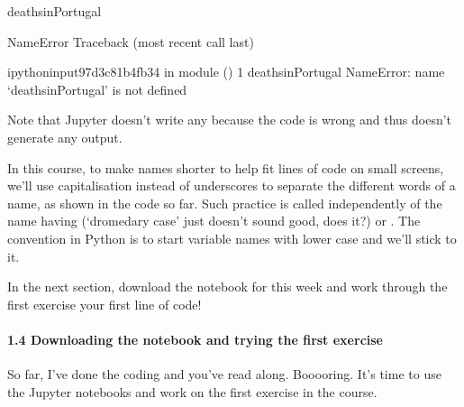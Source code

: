 \documentclass[letterpaper,10pt,english]{sphinxmanual}
\begin{document}
{
\begin{sphinxVerbatim}[commandchars=\\\{\}]
\llap{\color{nbsphinxin}[ ]:\,\hspace{\fboxrule}\hspace{\fboxsep}}
deathsinPortugal
\PYGZhy{}\PYGZhy{}\PYGZhy{}\PYGZhy{}\PYGZhy{}\PYGZhy{}\PYGZhy{}\PYGZhy{}\PYGZhy{}\PYGZhy{}\PYGZhy{}\PYGZhy{}\PYGZhy{}\PYGZhy{}\PYGZhy{}\PYGZhy{}\PYGZhy{}\PYGZhy{}\PYGZhy{}\PYGZhy{}\PYGZhy{}\PYGZhy{}\PYGZhy{}\PYGZhy{}\PYGZhy{}\PYGZhy{}\PYGZhy{}\PYGZhy{}\PYGZhy{}\PYGZhy{}\PYGZhy{}\PYGZhy{}\PYGZhy{}\PYGZhy{}\PYGZhy{}\PYGZhy{}\PYGZhy{}\PYGZhy{}\PYGZhy{}

NameError Traceback (most recent call last)

\PYGZlt{}ipython\PYGZhy{}input\PYGZhy{}9\PYGZhy{}7d3c81b4fb34\PYGZgt{} in \PYGZlt{}module ()
\PYGZhy{}\PYGZhy{}\PYGZhy{}\PYGZhy{}\PYGZgt{} 1 deathsinPortugal
NameError: name ‘deathsinPortugal’ is not defined
\end{sphinxVerbatim}
}

Note that Jupyter doesn’t write any  because the code is wrong and thus doesn’t generate any output.

In this course, to make names shorter to help fit lines of code on small screens, we’ll use capitalisation instead of underscores to separate the different words of a name, as shown in the code so far. Such practice is called  independently of the name having  (‘dromedary case’ just doesn’t sound good, does it?) or . The convention in Python is to start variable names with lower case and we’ll stick to it.

In the next section, download the notebook for this week and work through the first exercise \textendash{} your first line of code!


\paragraph{1.4 Downloading the notebook and trying the first exercise}
\label{\detokenize{content/session_01/Part_01_02:1.4-Downloading-the-notebook-and-trying-the-first-exercise}}
So far, I’ve done the coding and you’ve read along. Booooring. It’s time to use the Jupyter notebooks and work on the first exercise in the course.
\end{document}
